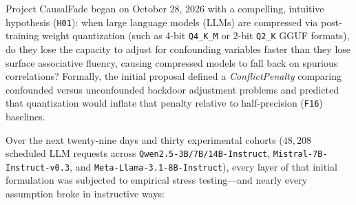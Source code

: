 Project CausalFade began on October 28, 2026 with a compelling, intuitive hypothesis (\texttt{H01}): when large language models (LLMs) are compressed via post-training weight quantization (such as 4-bit \texttt{Q4\_K\_M} or 2-bit \texttt{Q2\_K} GGUF formats), do they lose the capacity to adjust for confounding variables faster than they lose surface associative fluency, causing compressed models to fall back on spurious correlations? Formally, the initial proposal defined a \emph{ConflictPenalty} comparing confounded versus unconfounded backdoor adjustment problems and predicted that quantization would inflate that penalty relative to half-precision (\texttt{F16}) baselines.

Over the next twenty-nine days and thirty experimental cohorts ($48{,}208$ scheduled LLM requests across \texttt{Qwen2.5-3B/7B/14B-Instruct}, \texttt{Mistral-7B-Instruct-v0.3}, and \texttt{Meta-Llama-3.1-8B-Instruct}), every layer of that initial formulation was subjected to empirical stress testing---and nearly every assumption broke in instructive ways:

